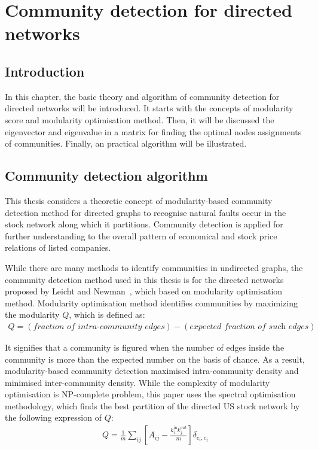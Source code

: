 \chapter{Community detection for directed networks}
\section{Introduction}
In this chapter, the basic theory and algorithm of community detection for directed networks will be introduced. It starts with the concepts of modularity score and modularity optimisation method. Then, it will be discussed the eigenvector and eigenvalue in a matrix for finding the optimal nodes assignments of communities. Finally, an practical algorithm will be illustrated.

\section{Community detection algorithm}
This thesis considers a theoretic concept of modularity-based community detection method for directed graphs to recognise natural faults occur in the stock network along which it partitions. Community detection is applied for further understanding to the overall pattern of economical and stock price relations of listed companies.

While there are many methods to identify communities in undirected graphs, the community detection method used in this thesis is for the directed networks proposed by Leicht and Newman~\cite{PhysRevLett.100.118703}, which based on modularity optimisation method. Modularity optimisation method identifies communities by maximizing the modularity $Q$, which is defined as:
\begin{eqnarray}
Q=(\textit{fraction of intra-community edges}) - (\textit{expected fraction of such edges})
\end{eqnarray}

It signifies that a community is figured when the number of edges inside the community is more than the expected number on the basis of chance. As a result, modularity-based community detection maximised intra-community density and minimised inter-community density. While the complexity of modularity optimisation is NP-complete problem, this paper uses the spectral optimisation methodology, which finds the best partition of the directed US stock network by the following expression of $Q$:
\begin{eqnarray}
Q=\frac{1}{m}\sum_{ij}{\left[A_{ij}-\frac{k_i^{\text{in}}k_j^{out}}{m}\right]}\delta_{c_i,c_j}
\end{eqnarray}

